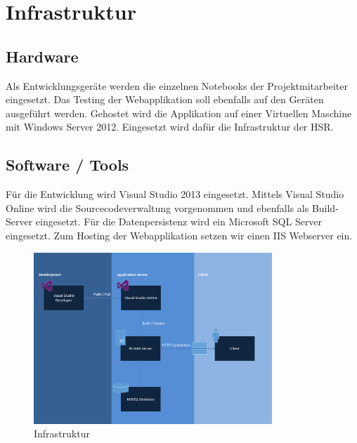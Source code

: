 \chapter{Infrastruktur}

\section{Hardware}
Als Entwicklungsgeräte werden die einzelnen Notebooks der Projektmitarbeiter eingesetzt. Das Testing der Webapplikation soll ebenfalls auf den Geräten ausgeführt werden. Gehostet wird die Applikation auf einer Virtuellen Maschine mit Windows Server 2012. Eingesetzt wird dafür die Infrastruktur der HSR.

\section{Software / Tools}
Für die Entwicklung wird Visual Studio 2013 eingesetzt. Mittels Visual Studio Online wird die Sourcecodeverwaltung vorgenommen und ebenfalls als Build-Server eingesetzt. Für die Datenpersistenz wird ein Microsoft SQL Server eingesetzt. Zum Hosting der Webapplikation setzen wir einen IIS Webserver ein.
\begin{figure}[h]
    \centering
    \includegraphics[width=0.8\textwidth]{content/images/infrastruktur.png}
    \caption{Infrastruktur}
\end{figure}
